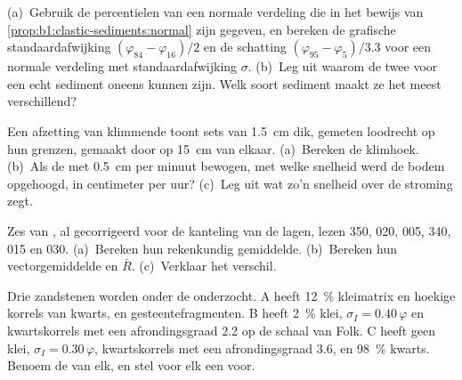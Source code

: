 \begin{exercise}[$\star\star$]\label{exo:b1:clastic-sediments:5}
(a)~Gebruik de percentielen van een normale verdeling die in het bewijs van \cref{prop:b1:clastic-sediments:normal} zijn gegeven, en bereken de grafische standaardafwijking
$(\varphi_{84} - \varphi_{16})/2$ en de schatting $(\varphi_{95} - \varphi_5)/3.3$ voor een normale verdeling met standaardafwijking $\sigma$. (b)~Leg uit waarom de twee voor een echt sediment oneens kunnen zijn. Welk soort sediment maakt ze het meest verschillend?
\end{exercise}

\begin{exercise}[$\star\star$]\label{exo:b1:clastic-sediments:6}
Een afzetting van klimmende  toont sets van \qty{1.5}{cm} dik, gemeten loodrecht op hun grenzen, gemaakt door  op \qty{15}{cm} van elkaar. (a)~Bereken de klimhoek. (b)~Als de  met \qty{0.5}{cm} per minuut bewogen, met welke snelheid werd de bodem opgehoogd, in centimeter per uur? (c)~Leg uit wat zo'n snelheid over de stroming zegt.
\end{exercise}

\begin{exercise}[$\star\star$]\label{exo:b1:clastic-sediments:7}
Zes  van , al gecorrigeerd voor de kanteling van de lagen, lezen 350, 020, 005, 340, 015 en 030. (a)~Bereken hun rekenkundig gemiddelde. (b)~Bereken hun vectorgemiddelde en $\bar R$. (c)~Verklaar het verschil.
\end{exercise}

\begin{exercise}[$\star\star$]\label{exo:b1:clastic-sediments:8}
Drie zandstenen worden onder de  onderzocht. A heeft \qty{12}{\percent} kleimatrix en hoekige korrels van kwarts,  en gesteentefragmenten. B heeft \qty{2}{\percent} klei, $\sigma_I = 0.40\,\varphi$ en kwartskorrels met een afrondingsgraad \num{2.2} op de schaal van Folk. C heeft geen klei, $\sigma_I =
0.30\,\varphi$, kwartskorrels met een afrondingsgraad \num{3.6}, en \qty{98}{\percent} kwarts. Benoem de  van elk, en stel voor elk een  voor.
\end{exercise}

